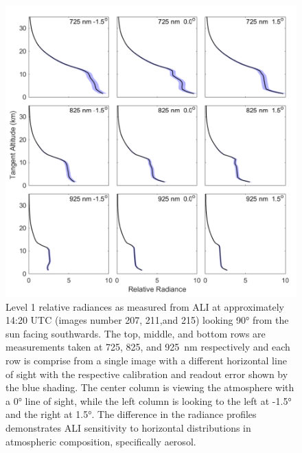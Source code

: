 
\begin{figure}
\includegraphics[width=1.0\textwidth]{./Images/5-2-AliRadiancesWithError.pdf}
    \caption[ALI Relative Radiance Vectors with Error and Horizontal Variance]{Level 1 relative radiances as measured from ALI at approximately 14:20 UTC (images number 207, 211,and 215) looking 90\si{\degree} from the sun facing southwards. The top, middle, and bottom rows are measurements taken at 725, 825, and 925~nm respectively and each row is comprise from a single image with a different horizontal line of sight with the respective calibration and readout error shown by the blue shading. The center column is viewing the atmosphere with a 0\si{\degree} line of sight, while the left column is looking to the left at -1.5\si{\degree} and the right at 1.5\si{\degree}. The difference in the radiance profiles demonstrates ALI sensitivity to horizontal distributions in atmospheric composition, specifically aerosol.}
    \label{fig:5.2:AliRadiances}
\end{figure}
